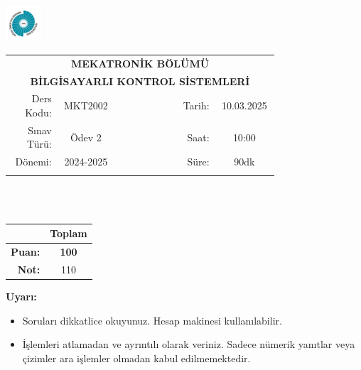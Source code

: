 \newcommand\UniversiteAdi{Niğde Ömer Halisdemir Üniversitesi}
\newcommand\BolumAdi{MEKATRONİK BÖLÜMÜ}
\newcommand\DersKodu{MKT2002}
\newcommand\DersAdi{BİLGİSAYARLI KONTROL SİSTEMLERİ}
\newcommand\SinavAdi{Ödev 2}
\newcommand\SinavTarihi{10.03.2025}
\newcommand\SinavSaati{10:00}
\newcommand\SinavSuresi{90dk}

\pagestyle{fancy}
\fancyhf{} %
\noindent \includegraphics[width=0.1\textwidth]{logo}
\begin{tabular}{
    p{0.15\linewidth}
    p{0.15\linewidth}
    p{0.2\linewidth}
    p{0.1\linewidth}
    p{0.15\linewidth}}
    \multicolumn{5}{c}{\textbf{\BolumAdi}}\\
    \multicolumn{5}{c}{\textbf{\DersAdi}}\\\hline
    \multicolumn{1}{|r|}{Ders Kodu:}&
    \multicolumn{1}{|c|}{\DersKodu}&
    \multicolumn{1}{|c|}{}& 
    \multicolumn{1}{|r|}{Tarih:}&
    \multicolumn{1}{|c|}{\SinavTarihi} \\\hline
    \multicolumn{1}{|r|}{Sınav Türü:}&
    \multicolumn{1}{|c|}{\SinavAdi}&  
    \multicolumn{1}{|c|}{}&
    \multicolumn{1}{|r|}{Saat:}&
    \multicolumn{1}{|c|}{\SinavSaati}\\\hline
    \multicolumn{1}{|r|}{Dönemi:}&
    \multicolumn{1}{|c|}{2024-2025}&
    \multicolumn{1}{|c|}{}&
    \multicolumn{1}{|r|}{Süre:}&
    \multicolumn{1}{|c|}{\SinavSuresi} \\\hline
    &&&&\\
\end{tabular}\\\\
\noindent\begin{center}
\begin{tabular}{|r|c|}\hline
    &\textbf{Toplam}\\\hline
    \textbf{Puan:} &\textbf{100}\\\hline
    \textbf{Not:}  &110\\\hline
\end{tabular}\end{center}
\noindent\textbf{Uyarı:}
\begin{itemize}\bfseries
    \item Soruları dikkatlice okuyunuz. Hesap makinesi kullanılabilir.
    \item İşlemleri atlamadan ve ayrıntılı olarak veriniz. Sadece nümerik yanıtlar veya çizimler ara işlemler olmadan kabul edilmemektedir.
\end{itemize}
